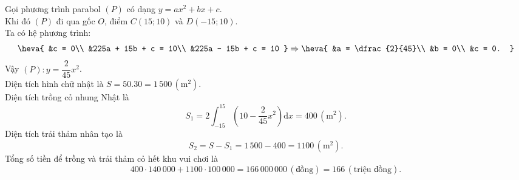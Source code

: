 \begin{bt}
{\begin{center}
		\end{center}
		Gọi phương trình parabol $(P)$ có dạng $y = ax^2 +  bx + c$.\\
		Khi đó $(P)$ đi qua gốc $O$, điểm $C(15;10)$  và $D(-15;10)$.\\
		Ta có hệ phương  trình:
		 $$
		 \heva{
		&c =  0\\
		&225a + 15b  + c = 10\\
		 &225a - 15b + c = 10
		} 
		\Rightarrow 
		\heva{ 
		&a  = \dfrac{2}{45}\\
		 &b = 0\\
		&c  = 0.
		} 
		$$ 
		Vậy $(P)\colon y =  \dfrac{2}{45}x^2$.\\
		Diện tích hình chữ nhật là $S  = 50.30 = 1\,500\, (\text{m}^2)$.\\
		Diện tích trồng cỏ nhung Nhật  là
		$$ 
		S_1 = 2\displaystyle\int_{-15}^{15} \left(10 - \dfrac{2}{45}x^2\right)\mathrm{d}x  = 400 \,(\text{m}^2).$$
		Diện tích trải  thảm nhân tạo là
		$$ 
		S_2 = S - S_1 = 1\,500 - 400  = 1100 \,(\text{m}^2).$$
		Tổng số tiền để trồng và trải thảm cỏ  hết khu vui chơi là
		$$400\cdot 140\,000 + 1100\cdot 100\,000  = 166\,000\,000 \, (\text{đồng}) =166 \,(\text{triệu đồng}).$$
	} 
\end{bt}

